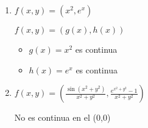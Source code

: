 \documentclass[../practica_03.tex]{subfiles}
\begin{document}
    \begin{enumerate}
        \item $f(x,y) = (x^2, e^x)$
        
            $ f(x,y) = (g(x), h(x)) $

            \begin{itemize}
                \item $g(x)=x^2$ es continua
                \item $h(x)=e^x$ es continua
            \end{itemize}

        \item $f(x,y) = (\frac{\sin(x^2+y^2)}{x^2+y^2}, \frac{e^{x^2+y^2}-1}{x^2+y^2})$

            No es continua en el (0,0)

    \end{enumerate}
\end{document}
